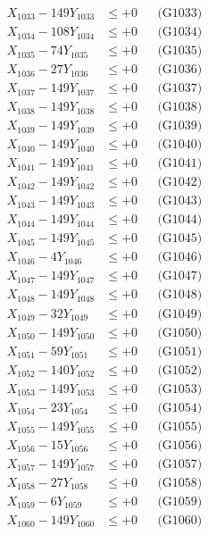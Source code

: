 \documentclass[a4paper,10pt]{article}
\begin{document}
{\begin{align}
X_{1033} - 149Y_{1033} &\leq +0 && \text{(G1033)} \\
X_{1034} - 108Y_{1034} &\leq +0 && \text{(G1034)} \\
X_{1035} - 74Y_{1035} &\leq +0 && \text{(G1035)} \\
X_{1036} - 27Y_{1036} &\leq +0 && \text{(G1036)} \\
X_{1037} - 149Y_{1037} &\leq +0 && \text{(G1037)} \\
X_{1038} - 149Y_{1038} &\leq +0 && \text{(G1038)} \\
X_{1039} - 149Y_{1039} &\leq +0 && \text{(G1039)} \\
X_{1040} - 149Y_{1040} &\leq +0 && \text{(G1040)} \\
\allowbreak
X_{1041} - 149Y_{1041} &\leq +0 && \text{(G1041)} \\
X_{1042} - 149Y_{1042} &\leq +0 && \text{(G1042)} \\
X_{1043} - 149Y_{1043} &\leq +0 && \text{(G1043)} \\
X_{1044} - 149Y_{1044} &\leq +0 && \text{(G1044)} \\
X_{1045} - 149Y_{1045} &\leq +0 && \text{(G1045)} \\
X_{1046} - 4Y_{1046} &\leq +0 && \text{(G1046)} \\
X_{1047} - 149Y_{1047} &\leq +0 && \text{(G1047)} \\
X_{1048} - 149Y_{1048} &\leq +0 && \text{(G1048)} \\
X_{1049} - 32Y_{1049} &\leq +0 && \text{(G1049)} \\
X_{1050} - 149Y_{1050} &\leq +0 && \text{(G1050)} \\
\allowbreak
X_{1051} - 59Y_{1051} &\leq +0 && \text{(G1051)} \\
X_{1052} - 140Y_{1052} &\leq +0 && \text{(G1052)} \\
X_{1053} - 149Y_{1053} &\leq +0 && \text{(G1053)} \\
X_{1054} - 23Y_{1054} &\leq +0 && \text{(G1054)} \\
X_{1055} - 149Y_{1055} &\leq +0 && \text{(G1055)} \\
X_{1056} - 15Y_{1056} &\leq +0 && \text{(G1056)} \\
X_{1057} - 149Y_{1057} &\leq +0 && \text{(G1057)} \\
X_{1058} - 27Y_{1058} &\leq +0 && \text{(G1058)} \\
X_{1059} - 6Y_{1059} &\leq +0 && \text{(G1059)} \\
X_{1060} - 149Y_{1060} &\leq +0 && \text{(G1060)} \\

\end{align}}
\end{document}
